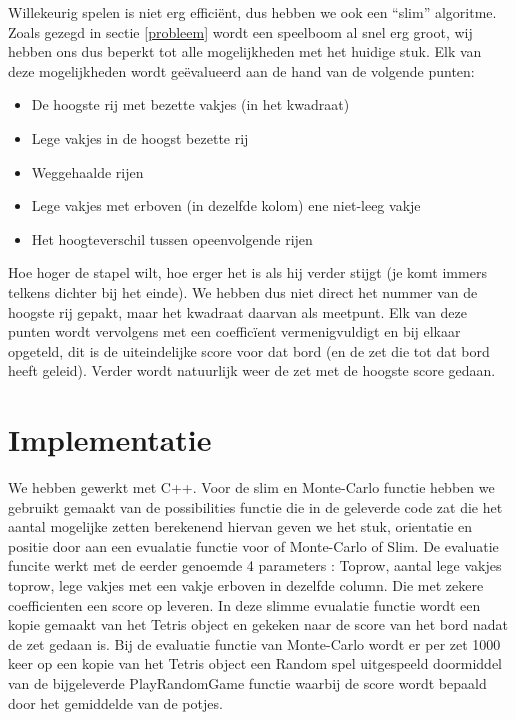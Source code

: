 \documentclass[10pt]{article}
\begin{document}
Willekeurig spelen is niet erg effici\"{e}nt, dus hebben we ook een ``slim'' algoritme. Zoals gezegd in sectie \ref{probleem} wordt een speelboom al snel erg groot, wij hebben ons dus beperkt tot alle mogelijkheden met het huidige stuk. Elk van deze mogelijkheden wordt ge\"{e}valueerd aan de hand van de volgende punten:
\begin{itemize}

\item De hoogste rij met bezette vakjes (in het kwadraat)

\item Lege vakjes in de hoogst bezette rij

\item Weggehaalde rijen

\item Lege vakjes met erboven (in dezelfde kolom) ene niet-leeg vakje

\item Het hoogteverschil tussen opeenvolgende rijen

\end{itemize}
Hoe hoger de stapel wilt, hoe erger het is als hij verder stijgt (je komt immers telkens dichter bij het einde). We hebben dus niet direct het nummer van de hoogste rij gepakt, maar het kwadraat daarvan als meetpunt. Elk van deze punten wordt vervolgens met een coeffic\"{i}ent vermenigvuldigt en bij elkaar opgeteld, dit is de uiteindelijke score voor dat bord (en de zet die tot dat bord heeft geleid). Verder wordt natuurlijk weer de zet met de hoogste score gedaan.

\section{Implementatie}

We hebben gewerkt met C++. Voor de slim en Monte-Carlo functie hebben we gebruikt gemaakt van de possibilities functie die in de geleverde code zat die het aantal mogelijke zetten berekenend hiervan geven we het stuk, orientatie en positie door aan een evualatie functie voor of Monte-Carlo of Slim. De evaluatie funcite werkt met de eerder genoemde 4 parameters : Toprow, aantal lege vakjes toprow, lege vakjes met een vakje erboven in dezelfde column. Die met zekere coefficienten een score op leveren. In deze slimme evualatie functie wordt een kopie gemaakt van het Tetris object en gekeken naar de score van het bord nadat de zet gedaan is. Bij de evaluatie functie van Monte-Carlo wordt er per zet 1000 keer op een kopie van het Tetris object een Random spel uitgespeeld doormiddel van de bijgeleverde PlayRandomGame functie waarbij de score wordt bepaald door het gemiddelde van de potjes.
\end{document}

